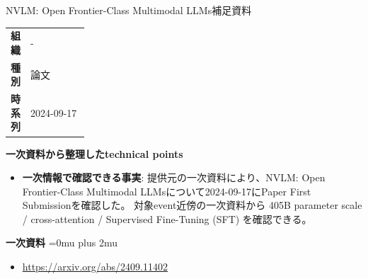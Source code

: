\begin{technicalnote}{NVLM: Open Frontier-Class Multimodal LLMs}{補足資料}
\begingroup
\begin{tabularx}{\linewidth}{@{}>{\bfseries}p{0.22\linewidth}X@{}}
組織 & - \\
種別 & 論文 \\
時系列 & 2024-09-17 \\
\end{tabularx}
\smallskip
{\bfseries 一次資料から整理したtechnical points}
\begin{itemize}[leftmargin=1.5em,itemsep=0.35em]
\item \textbf{一次情報で確認できる事実}: 提供元の一次資料により、NVLM: Open Frontier-Class Multimodal LLMsについて2024-09-17にPaper First Submissionを確認した。 対象event近傍の一次資料から 405B parameter scale / cross-attention / Supervised Fine-Tuning (SFT) を確認できる。
\end{itemize}
\begin{minipage}{\linewidth}
\begin{samepage}
{\bfseries 一次資料}
\begingroup\sloppy
\Urlmuskip=0mu plus 2mu\relax
\begin{itemize}[leftmargin=1.5em,itemsep=0.25em]
\item {\scriptsize\url{https://arxiv.org/abs/2409.11402}}
\end{itemize}
\endgroup
\end{samepage}
\end{minipage}
\endgroup
\end{technicalnote}
\medskip

